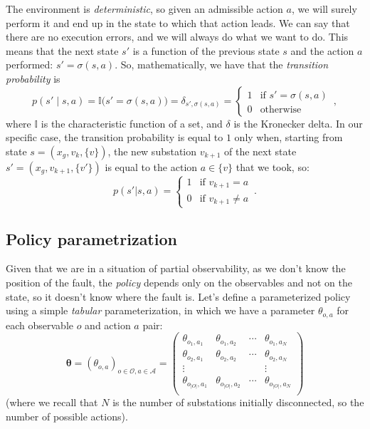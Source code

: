 The environment is \emph{deterministic}, so given an admissible action $a$, we will surely perform it and end up in the state to which that action leads. We can say that there are no execution errors, and we will always do what we want to do. This means that the next state $s'$ is a function of the previous state $s$ and the action $a$ performed: $s' = \sigma(s,a)$. So, mathematically, we have that the \emph{transition probability} is
\begin{equation}
    p(s' \mid s, a) = \mathbb I\big(s' = \sigma(s, a)\big) = \delta_{s', \sigma(s,a)} = \begin{cases} 1 & \text{if } s'=\sigma(s,a) \\ 0 & \text{otherwise} \end{cases} \,,
\end{equation}
where $\mathbb I$ is the characteristic function of a set, and $\delta$ is the Kronecker delta. In our specific case, the transition probability is equal to $1$ only when, starting from state $s = (x_g, v_k, \{v\})$, the new substation $v_{k+1}$ of the next state $s' = (x_g, v_{k+1}, \{v'\})$ is equal to the action $a \in \{v\}$ that we took, so:
\begin{equation}
    p(s' | s,a) = \begin{cases}
        1 & \text{if } v_{k+1} = a \\
        0 & \text{if } v_{k+1} \neq a
    \end{cases} \,.
    \label{eq:transprob}
\end{equation}


\subsection{Policy parametrization}

Given that we are in a situation of partial observability, as we don't know the position of the fault, the \emph{policy} depends only on the observables and not on the state, so it doesn't know where the fault is. Let's define a parameterized policy using a simple \emph{tabular} parameterization, in which we have a parameter $\theta_{o,a}$ for each observable $o$ and action $a$ pair:
\begin{equation}
    \boldsymbol \theta = (\theta_{o,a})_{o \in \mathcal O, a \in \mathcal A} = \begin{pmatrix}
        \theta_{o_1, a_1} & \theta_{o_1, a_2} & \cdots & \theta_{o_1, a_N} \\
        \theta_{o_2, a_1} & \theta_{o_2, a_2} & \cdots & \theta_{o_2, a_N} \\
        \vdots            &                   &        & \vdots            \\
        \theta_{o_{|O|}, a_1} & \theta_{o_{|O|}, a_2}  & \cdots &  \theta_{o_{|O|}, a_N} \\
    \end{pmatrix}
\end{equation}
(where we recall that $N$ is the number of substations initially disconnected, so the number of possible actions).

